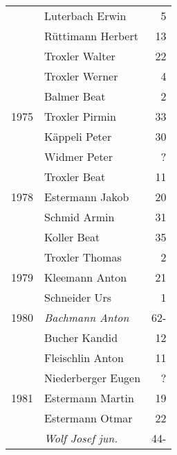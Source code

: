 {\begin{longtable}{ l l r }
                      & Luterbach Erwin                           & 5           \\
                      & Rüttimann Herbert                         & 13          \\
                      & Troxler Walter                            & 22          \\
                      & Troxler Werner                            & 4           \\
                      & Balmer Beat                               & 2           \\
        1975          & Troxler Pirmin                            & 33          \\
                      & Käppeli Peter                             & 30          \\
                      & Widmer Peter                              & ?           \\
                      & Troxler Beat                              & 11          \\
        1978          & Estermann Jakob                           & 20          \\
                      & Schmid Armin                              & 31          \\
                      & Koller Beat                               & 35          \\
                      & Troxler Thomas                            & 2           \\
        1979          & Kleemann Anton                            & 21          \\
                      & Schneider Urs                             & 1           \\
        1980          & \emph{Bachmann Anton}                     & 62-         \\
                      & Bucher Kandid                             & 12          \\
                      & Fleischlin Anton                          & 11          \\
                      & Niederberger Eugen                        & ?           \\
        1981          & Estermann Martin                          & 19          \\
                      & Estermann Otmar                           & 22          \\
                      & \emph{Wolf Josef jun.}                    & 44-         \\

\end{longtable}}
